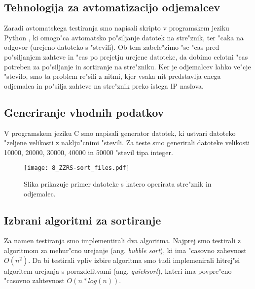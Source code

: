 \subsection{Tehnologija za avtomatizacijo odjemalcev}
Zaradi avtomatskega testiranja smo napisali skripto v programskem jeziku Python \cite{8_py}, ki omogo"ca avtomatsko po"siljanje datotek na stre"znik, ter "caka na odgovor (urejeno datoteko s "stevili). Ob tem zabele"zimo "se "cas pred po"siljanjem zahteve in "cas po prejetju urejene datoteke, da dobimo celotni "cas potreben za po"siljanje in sortiranje na stre"zniku. Ker je odjemalcev lahko ve"cje "stevilo, smo ta problem re"sili z nitmi, kjer vsaka nit predstavlja enega odjemalca in po"silja zahteve na stre"znik preko istega IP naslova.

\subsection{Generiranje vhodnih podatkov}
V programskem jeziku C smo napisali generator datotek, ki ustvari datoteko "zeljene velikosti z naklju"cnimi "stevili. Za teste smo generirali datoteke velikosti 10000, 20000, 30000, 40000 in 50000 "stevil tipa integer.

\begin{figure} [!h]
  \centering
    \texttt{[image: 8\_ZZRS-sort\_files.pdf]}
  \caption{Slika prikazuje primer datoteke s katero operirata stre"znik in odjemalec.}
  \label{8_files}
\end{figure}

\subsection{Izbrani algoritmi za sortiranje}
\label{8_izbira_algoritmov}
Za namen testiranja smo implementirali dva algoritma. Najprej smo testirali z algoritmom za mehur"cno urejanje (ang. \textit{bubble sort}), ki ima "casovno zahevnost $O(n^2)$.
Da bi testirali vpliv izbire algoritma smo tudi implemenirali hitrej"si algoritem urejanja s porazdelitvami (ang. \textit{quicksort}), kateri ima povpre"cno "casovno zahtevnost $O(n* log(n))$.



